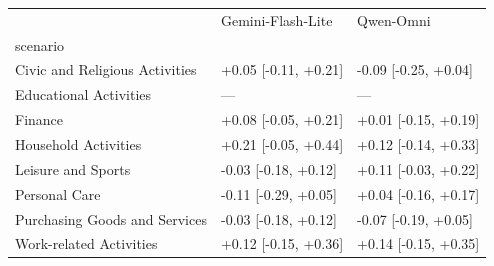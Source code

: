 \begin{tabular}{lll}
\toprule
 & Gemini-Flash-Lite & Qwen-Omni \\
scenario &  &  \\
\midrule
Civic and Religious Activities & +0.05 [-0.11, +0.21] & -0.09 [-0.25, +0.04] \\
Educational Activities & — & — \\
Finance & +0.08 [-0.05, +0.21] & +0.01 [-0.15, +0.19] \\
Household Activities & +0.21 [-0.05, +0.44] & +0.12 [-0.14, +0.33] \\
Leisure and Sports & -0.03 [-0.18, +0.12] & +0.11 [-0.03, +0.22] \\
Personal Care & -0.11 [-0.29, +0.05] & +0.04 [-0.16, +0.17] \\
Purchasing Goods and Services & -0.03 [-0.18, +0.12] & -0.07 [-0.19, +0.05] \\
Work-related Activities & +0.12 [-0.15, +0.36] & +0.14 [-0.15, +0.35] \\
\bottomrule
\end{tabular}
